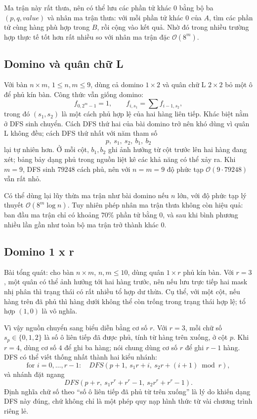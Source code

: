 \documentclass[11pt]{article}
\newcommand{\Oh}{\mathcal{O}}
\begin{document}
Ma trận này rất thưa, nên có thể lưu các phần tử khác \(0\) bằng bộ ba
\((p,q,value)\) và nhân ma trận thưa: với mỗi phần tử khác \(0\) của \(A\),
tìm các phần tử cùng hàng phù hợp trong \(B\), rồi cộng vào kết quả. Nhờ đó
trong nhiều trường hợp thực tế tốt hơn rất nhiều so với nhân ma trận đặc
\(\Oh(8^m)\).

\subsection{Domino và quân chữ L}

Với bàn \(n\times m\), \(1\le n,m\le 9\), dùng cả domino \(1\times2\) và quân
chữ L \(2\times2\) bỏ một ô để phủ kín bàn. Công thức vẫn giống domino:
\[
  f_{0,2^m-1}=1,\qquad
  f_{i,s_1}=\sum f_{i-1,s_2},
\]
trong đó \((s_1,s_2)\) là một cách phủ hợp lệ của hai hàng liên tiếp. Khác
biệt nằm ở DFS sinh chuyển. Cách DFS thứ hai của bài domino trở nên khó dùng
vì quân L không đều; cách DFS thứ nhất với năm tham số
\[
  p,\ s_1,\ s_2,\ b_1,\ b_2
\]
lại tự nhiên hơn. Ở mỗi cột, \(b_1,b_2\) ghi ảnh hưởng từ cột trước lên hai
hàng đang xét; bảng bảy dạng phủ trong nguồn liệt kê các khả năng có thể xảy
ra. Khi \(m=9\), DFS sinh \(79248\) cách phủ, nên với \(n=m=9\) độ phức tạp
\(\Oh(9\cdot 79248)\) vẫn rất nhỏ.

Có thể dùng lại lũy thừa ma trận như bài domino nếu \(n\) lớn, với độ phức
tạp lý thuyết \(\Oh(8^m\log n)\). Tuy nhiên phép nhân ma trận thưa không còn
hiệu quả: ban đầu ma trận chỉ có khoảng \(70\%\) phần tử bằng \(0\), và sau
khi bình phương nhiều lần gần như toàn bộ ma trận trở thành khác \(0\).

\subsection{Domino 1 x r}

Bài tổng quát: cho bàn \(n\times m\), \(n,m\le10\), dùng quân \(1\times r\)
phủ kín bàn. Với \(r=3\), một quân có thể ảnh hưởng tới hai hàng trước, nên
nếu lưu trực tiếp hai mask nhị phân thì trạng thái có rất nhiều tổ hợp dư
thừa. Cụ thể, với một cột, nếu hàng trên đã phủ thì hàng dưới không thể còn
trống trong trạng thái hợp lệ; tổ hợp \((1,0)\) là vô nghĩa.

Vì vậy nguồn chuyển sang biểu diễn bằng cơ số \(r\). Với \(r=3\), mỗi chữ số
\(s_p\in\{0,1,2\}\) là số ô liên tiếp đã được phủ, tính từ hàng trên xuống, ở
cột \(p\). Khi \(r=4\), dùng cơ số \(4\) để ghi ba hàng; nói chung dùng cơ số
\(r\) để ghi \(r-1\) hàng. DFS có thể viết thống nhất thành hai kiểu nhánh:
\[
  \text{for }i=0,\ldots,r-1:\quad
  DFS(p+1,\ s_1r+i,\ s_2r+(i+1)\bmod r),
\]
và nhánh đặt ngang
\[
  DFS(p+r,\ s_1r^r+r^r-1,\ s_2r^r+r^r-1).
\]
Định nghĩa chữ số theo ``số ô liên tiếp đã phủ từ trên xuống'' là lý do khiến
dạng DFS này đúng, chứ không chỉ là một phép quy nạp hình thức từ vài chương
trình riêng lẻ.
\end{document}
